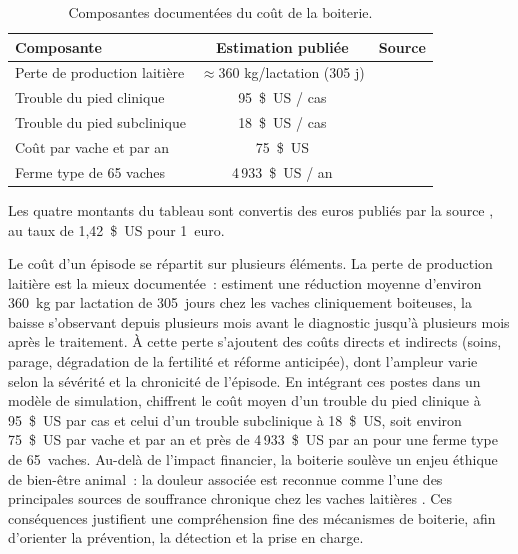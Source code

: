 \begin{table}[H]
    \centering
    \caption{Composantes documentées du coût de la boiterie.}
    \label{tab:impact_economique}
    \small
    \begin{tabular}{lcc}
        \toprule
        \textbf{Composante} & \textbf{Estimation publiée} & \textbf{Source} \\
        \midrule
        Perte de production laitière & $\approx$360 kg/lactation (305 j) & \citep{green2002financial} \\
        Trouble du pied clinique & 95~\$~US / cas & \citep{bruijnis2010assessing} \\
        Trouble du pied subclinique & 18~\$~US / cas & \citep{bruijnis2010assessing} \\
        Coût par vache et par an & 75~\$~US & \citep{bruijnis2010assessing} \\
        Ferme type de 65 vaches & 4\,933~\$~US / an & \citep{bruijnis2010assessing} \\
        \bottomrule
    \end{tabular}

    \vspace{0.4em}
    {\footnotesize\raggedright Les quatre montants du tableau sont convertis des euros publiés par la source
    \citep{bruijnis2010assessing}, au taux de 1,42~\$~US pour 1~euro.\par}
\end{table}
\vspace{-0.9\baselineskip}

Le coût d'un épisode se répartit sur plusieurs éléments. La perte de production laitière est
la mieux documentée~: \citet{green2002financial} estiment une réduction moyenne d'environ
360~kg par lactation de 305~jours chez les vaches cliniquement boiteuses, la baisse
s'observant depuis plusieurs mois avant le diagnostic jusqu'à plusieurs mois après le
traitement. À cette perte s'ajoutent des coûts directs et indirects (soins, parage,
dégradation de la fertilité et réforme anticipée), dont l'ampleur varie selon la sévérité
et la chronicité de l'épisode. En intégrant ces postes dans un modèle de simulation,
\citet{bruijnis2010assessing} chiffrent le coût moyen d'un trouble du pied clinique à
95~\$~US par cas et celui d'un trouble subclinique à 18~\$~US, soit environ
75~\$~US par vache et par an et près de 4\,933~\$~US par an pour une
ferme type de 65~vaches.
Au-delà de l'impact financier, la boiterie soulève un enjeu éthique de bien-être animal~:
la douleur associée est reconnue comme l'une des principales sources de souffrance
chronique chez les vaches laitières \citep{whay2003assessment,broom2017animal}. Ces conséquences
justifient une compréhension fine des mécanismes de boiterie, afin d'orienter la
prévention, la détection et la prise en charge.

